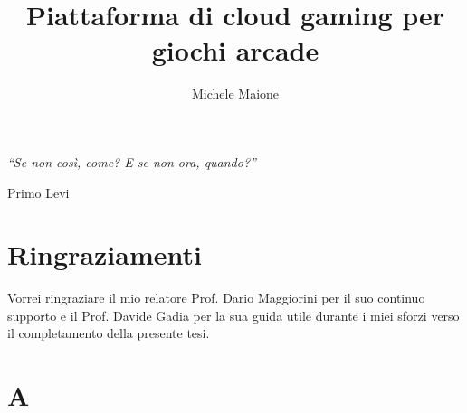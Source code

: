 \documentclass[italian, openany]{book}
\title{Piattaforma di cloud gaming per giochi arcade}
\author{Michele Maione}
\begin{document}
\frontespizio

\frontmatter
{
\raggedleft \large \sl 
	``Se non così, come? E se non ora, quando?''
	
	\bigskip
	
	\textemdash Primo Levi\\
}

\chapter*{Ringraziamenti}
Vorrei ringraziare il mio relatore Prof. Dario Maggiorini per il suo continuo supporto e il Prof. Davide Gadia per la sua guida utile durante i miei sforzi verso il completamento della presente tesi.

\setcounter{tocdepth}{1}
\tableofcontents



\mainmatter






% 
% 

\appendix

\chapter{A}

\backmatter
\printbibliography[nottype=misc,title={Bibliografia},heading=bibintoc]
\printbibliography[type=misc,title={Sitografia},heading=bibintoc]



\end{document}
